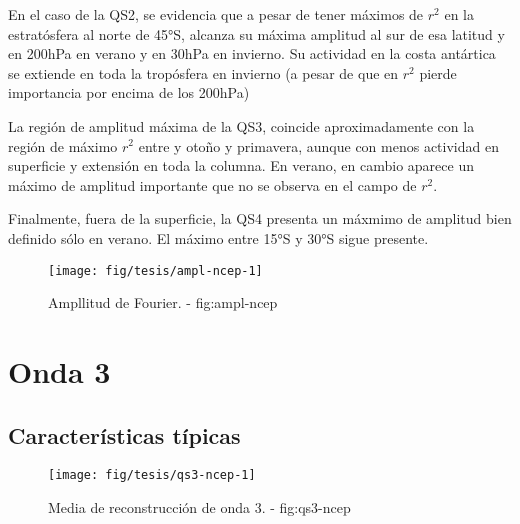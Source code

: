 \documentclass[spanish,a4paper]{book}
\begin{document}
En el caso de la QS2, se evidencia que a pesar de tener máximos de
\(r^2\) en la estratósfera al norte de 45°S, alcanza su máxima amplitud
al sur de esa latitud y en 200hPa en verano y en 30hPa en invierno. Su
actividad en la costa antártica se extiende en toda la tropósfera en
invierno (a pesar de que en \(r^2\) pierde importancia por encima de los
200hPa)

La región de amplitud máxima de la QS3, coincide aproximadamente con la
región de máximo \(r^2\) entre y otoño y primavera, aunque con menos
actividad en superficie y extensión en toda la columna. En verano, en
cambio aparece un máximo de amplitud importante que no se observa en el
campo de \(r^2\).

Finalmente, fuera de la superficie, la QS4 presenta un máxmimo de
amplitud bien definido sólo en verano. El máximo entre 15°S y 30°S sigue
presente.

\begin{figure}

{\centering \texttt{[image: fig/tesis/ampl-ncep-1]} 

}

\caption{Ampllitud de Fourier. - fig:ampl-ncep}\label{fig:ampl-ncep}
\end{figure}


\chapter{Onda 3}\label{onda-3}


\section{Características típicas}\label{caracteristicas-tipicas}

\begin{figure*}
\texttt{[image: fig/tesis/qs3-ncep-1]} \caption{Media de reconstrucción de onda 3. - fig:qs3-ncep}\label{fig:qs3-ncep}
\end{figure*}
\end{document}
